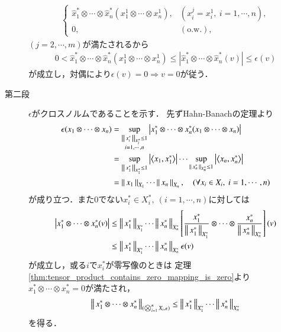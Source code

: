 \begin{prf}
\begin{description}
\begin{align}
					\begin{cases}
						\hat{x}_1^* \otimes \cdots \otimes \hat{x}_n^*(x^1_1 \otimes \cdots \otimes x^1_n), & (x^j_i = x^1_i,\ i=1,\cdots,n), \\
						0, & (\mbox{o.w.}),
					\end{cases}
				\end{align}
				$(j=2,\cdots,m)$が満たされるから
				\begin{align}
					0 < \hat{x}_1^* \otimes \cdots \otimes \hat{x}_n^*(x^1_1 \otimes \cdots \otimes x^1_n) 
					\leq \left| \hat{x}_1^* \otimes \cdots \otimes \hat{x}_n^* (v) \right|
					\leq \epsilon(v)
					\label{eq:thm_injective_norm_is_the_minimum_cross_norm_1}
				\end{align}
				が成立し，対偶により$\epsilon(v) = 0 \Rightarrow v = 0$が従う．
				
			\item[第二段]
				$\epsilon$がクロスノルムであることを示す．
				先ずHahn-Banachの定理より
				\begin{align}
					\epsilon(x_1 \otimes \cdots \otimes x_n) 
					&= \sup{\substack{\Norm{x_i^*}{X_i^*}\leq 1 \\ i=1,\cdots,n}}{\left| x_1^* \otimes \cdots \otimes x_n^* (x_1 \otimes \cdots \otimes x_n) \right|} \\
					&= \sup{\Norm{x_1^*}{X_1^*} \leq 1}{\left| \inprod<x_1,x_1^*> \right|}
					\cdots \sup{\Norm{x_n^*}{X_n^*} \leq 1}{\left| \inprod<x_n,x_n^*> \right|} \\
					&= \Norm{x_1}{X_1} \cdots \Norm{x_n}{X_n},
					\quad (\forall x_i \in X_i,\ i=1,\cdots,n)
				\end{align}
				が成り立つ．また0でない$x_i^* \in X_i^*,\ (i=1,\cdots,n)$に対しては
				\begin{align}
					\left| x_1^* \otimes \cdots \otimes x_n^* (v) \right|
					&\leq \left\|\, x_1^*\, \right\|_{X_1^*} \cdots \left\|\, x_n^*\, \right\|_{X_n^*} \left[ \frac{x_1^*}{\left\|\, x_1^*\, \right\|_{X_1^*}} \otimes \cdots \otimes \frac{x_n^*}{\left\|\, x_n^*\, \right\|_{X_n^*}} \right] (v) \\
					&\leq \left\|\, x_1^*\, \right\|_{X_1^*} \cdots \left\|\, x_n^*\, \right\|_{X_n^*} \epsilon(v)
				\end{align}
				が成立し，或る$i$で$x_i^*$が零写像のときは
				定理\ref{thm:tensor_product_contains_zero_mapping_is_zero}より
				$x_1^* \otimes \cdots \otimes x_n^* = 0$が満たされ，
				\begin{align}
					\left\|\, x_1^* \otimes \cdots \otimes x_n^*\, \right\|_{(\bigotimes_{i=1}^n X_i,\epsilon)} \leq \left\|\, x_1^*\, \right\|_{X_1^*} \cdots \left\|\, x_n^*\, \right\|_{X_n^*}
				\end{align}
				を得る．
			

\end{description}
\end{prf}
